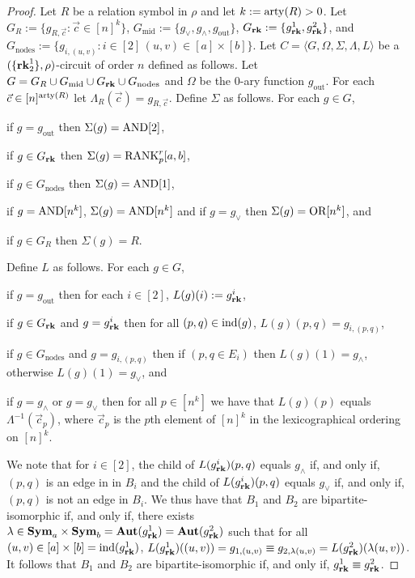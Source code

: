 \documentclass[../paper.tex]{subfiles}
\begin{document}
\begin{proof}
  Let $R$ be a relation symbol in $\rho$ and let $k := \mathrm{arty}(R) > 0$. Let $G_{R}
  := \{g_{R, \vec{c}} : \vec{c} \in [n]^k\}$, $G_{\text{mid}} := \{g_{\lor},
  g_{\land}, g_{\text{out}} \}$, $G_{\text{\textbf{rk}}} : = \{ g^1_{\text{\textbf{rk}}}, g^2_{\text{\textbf{rk}}}\}$,
  and $G_{\text{nodes}} := \{g_{i, (u,v)} : i \in [2] \, (u,v) \in [a] \times
  [b] \}$. Let $C = \langle G, \Omega, \Sigma, \Lambda, L \rangle$ be a
  $(\{\text{\textbf{rk}}^{1}_2\}, \rho)$-circuit of order $n$ defined as follows. Let $G =
  G_R \cup G_{\text{mid}} \cup G_{\text{\textbf{rk}}} \cup G_{\text{nodes}}$ and $\Omega$ be
  the $0$-ary function $g_{\text{out}}$. For each $\vec{c} \in [n]^{\mathrm{arty}(R)}$
  let $\Lambda_R(\vec{c}) = g_{R, \vec{c}}$. Define $\Sigma$ as follows. For
  each $g \in G$,
  \begin{myitemize}
  \item if $g = g_{\text{out}}$ then $\Sigma(g) = \text{\upshape AND}[2]$,
  \item if $g \in G_{\text{\textbf{rk}}}$ then $\Sigma(g) = \text{\upshape RANK}^r_p [a,b]$,
  \item if $g \in G_{\text{nodes}}$ then $\Sigma(g) = \text{\upshape AND}[1]$,
  \item if $g = \text{\upshape AND}[n^k]$, $\Sigma (g) = \text{\upshape AND}[n^k]$ and if $g = g_{\lor}$ then
    $\Sigma(g) = \text{\upshape OR}[n^k]$, and
  \item if $g \in G_R$ then $\Sigma(g) = R$.
  \end{myitemize}
  Define $L$ as follows. For each $g \in G$,
  \begin{myitemize}
    \setlength\itemsep{0mm}
  \item if $g = g_{\text{out}}$ then for each $i \in [2]$, $L(g)(i) :=
    g^i_{\text{\textbf{rk}}}$,
  \item if $g \in G_{\text{\textbf{rk}}}$ and $g = g^i_{\text{\textbf{rk}}}$ then for all $(p,q) \in
    \text{\upshape ind}(g)$, $L(g)(p,q) = g_{i, (p,q)}$,
  \item if $g \in G_{\text{nodes}}$ and $g = g_{i, (p,q)}$ then if $(p, q \in
    E_i)$ then $L(g)(1) = g_{\land}$, otherwise $L(g)(1) = g_\lor$, and
  \item if $g = g_\land$ or $g = g_\lor$ then for all $p \in [n^k]$ we have that
    $L(g)(p)$ equals $\Lambda^{-1}(\vec{c}_p)$, where $\vec{c}_p$ is the $p$th
    element of $[n]^k$ in the lexicographical ordering on $[n]^k$.
  \end{myitemize}

  We note that for $i \in [2]$, the child of $L(g^i_{\text{\textbf{rk}}})(p,q)$ equals
  $g_\land$ if, and only if, $(p,q)$ is an edge in in $B_i$ and the child of
  $L(g^i_{\text{\textbf{rk}}})(p,q) $ equals $g_\lor$ if, and only if, $(p,q)$ is not an edge
  in $B_i$. We thus have that $B_1$ and $B_2$ are bipartite-isomorphic if, and
  only if, there exists $\lambda \in \text{\textbf{Sym}}_{a} \times \text{\textbf{Sym}}_{b} =
  \text{\textbf{Aut}}(g^1_{\text{\textbf{rk}}}) = \text{\textbf{Aut}}(g^2_{\text{\textbf{rk}}})$ such that for all $(u,v) \in [a] \times
  [b] = \text{\upshape ind}(g^1_{\text{\textbf{rk}}})$, $L(g^1_{\text{\textbf{rk}}})((u,v)) = g_{1, (u,v)} \equiv g_{2,
    \lambda (u,v)} = L(g^2_{\text{\textbf{rk}}})(\lambda (u,v))$. It follows that $B_1$ and
  $B_2$ are bipartite-isomorphic if, and only if, $g^1_{\text{\textbf{rk}}} \equiv
  g^2_{\text{\textbf{rk}}}$.


\end{proof}
\end{document}
